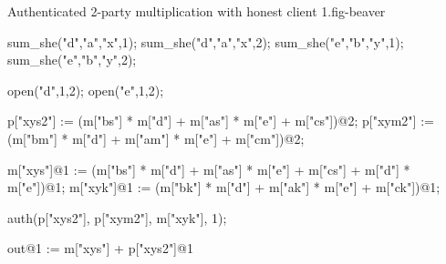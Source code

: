 \begin{fpfig}[t]{Authenticated 2-party multiplication with honest client 1.}{fig-beaver}
{\footnotesize
\begin{verbatimtab}
sum_she("d","a","x",1);
sum_she("d","a","x",2);
sum_she("e","b","y",1);
sum_she("e","b","y",2);

open("d",1,2);
open("e",1,2);

p["xys2"] := (m["bs"] * m["d"] + m["as"] * m["e"] + m["cs"])@2;
p["xym2"] := (m["bm"] * m["d"] + m["am"] * m["e"] + m["cm"])@2;

m["xys"]@1 := (m["bs"] * m["d"] + m["as"] * m["e"] + m["cs"] +
               m["d"] * m["e"])@1;
m["xyk"]@1 := (m["bk"] * m["d"] + m["ak"] * m["e"] + m["ck"])@1;

auth(p["xys2"], p["xym2"], m["xyk"], 1);

out@1 := m["xys"] + p["xys2"]@1
\end{verbatimtab}
}
\end{fpfig}

\begin{comment}

\begin{fpfig}[t]{Authenticated 2-Party Multiplication.}{fig-beaver}
{\footnotesize
  \begin{verbatimtab}
    secopen("a","x","d",1,2);
    secopen("a","x","d",2,1);
    secopen("b","y","e",1,2);
    secopen("b","y","e",2,1);
    let xys =
      macsum(macctimes(macshare("b"), m["d"]),
             macsum(macctimes(macshare("a"), m["e"]),
                    macshare("c")))
    in
    let xyk = mack("b") * m["d"] + mack("a") * m["d"] + mack("c")               
    in
    secreveal(xys,xyk,"1",1,2);
    secreveal(maccsum(xys,m["d"] * m["e"]),
              xyk - m["d"] * m["e"],
              "2",2,1);
    out@1 := (p[1] + p[2])@1;
    out@2 := (p[1] + p[2])@2;
  \end{verbatimtab}
}
\end{fpfig}

\end{comment}
